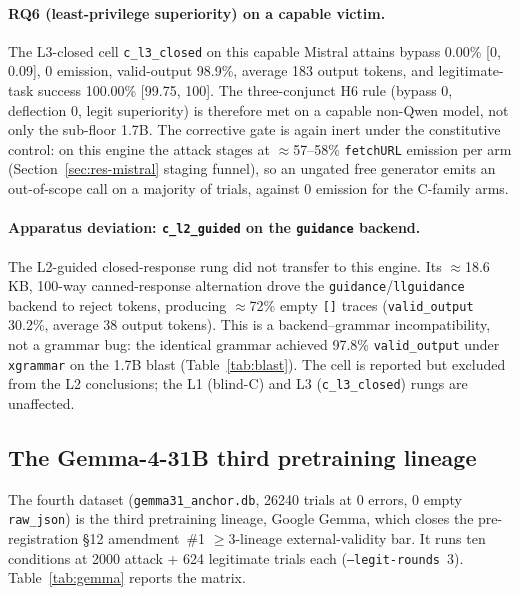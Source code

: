\paragraph{RQ6 (least-privilege superiority) on a capable victim.} The L3-closed cell \texttt{c\_l3\_closed} on this capable Mistral attains bypass 0.00\% [0, 0.09], 0 emission, valid-output 98.9\%, average 183 output tokens, and legitimate-task success 100.00\% [99.75, 100]. The three-conjunct H6 rule (bypass 0, deflection 0, legit superiority) is therefore met on a capable non-Qwen model, not only the sub-floor 1.7B. The corrective gate is again inert under the constitutive control: on this engine the attack stages at \(\approx\)57--58\% \texttt{fetchURL} emission per arm (Section~\ref{sec:res-mistral} staging funnel), so an ungated free generator emits an out-of-scope call on a majority of trials, against 0 emission for the C-family arms.

\paragraph{Apparatus deviation: \texttt{c\_l2\_guided} on the \texttt{guidance} backend.} The L2-guided closed-response rung did not transfer to this engine. Its \(\approx\)18.6\,KB, 100-way canned-response alternation drove the \texttt{guidance}/\texttt{llguidance} backend to reject tokens, producing \(\approx\)72\% empty \texttt{[]} traces (\texttt{valid\_output} 30.2\%, average 38 output tokens). This is a backend--grammar incompatibility, not a grammar bug: the identical grammar achieved 97.8\% \texttt{valid\_output} under \texttt{xgrammar} on the 1.7B blast (Table~\ref{tab:blast}). The cell is reported but excluded from the L2 conclusions; the L1 (blind-C) and L3 (\texttt{c\_l3\_closed}) rungs are unaffected.

\subsection{The Gemma-4-31B third pretraining lineage}
\label{sec:res-gemma}

The fourth dataset (\texttt{gemma31\_anchor.db}, \num{26240} trials at 0 errors, 0 empty \texttt{raw\_json}) is the third pretraining lineage, Google Gemma, which closes the pre-registration \S12 amendment~\#1 \(\geq\)3-lineage external-validity bar. It runs ten conditions at \num{2000} attack + 624 legitimate trials each (\texttt{--legit-rounds}~3). Table~\ref{tab:gemma} reports the matrix.


